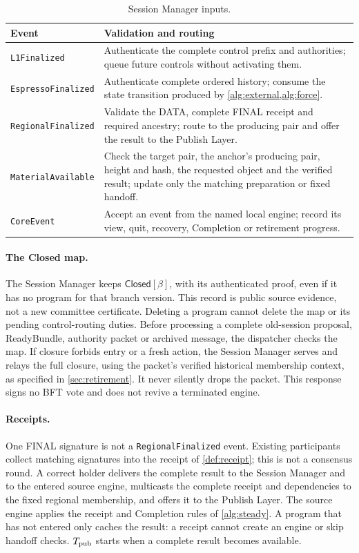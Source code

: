 \documentclass[11pt,a4paper]{article}
\newcommand{\tagg}[1]{\ensuremath{\mathsf{#1}}}
\begin{document}
\begin{table}[htbp]\centering\small
\caption{Session Manager inputs.}
\label{tab:manager-inputs}
\begin{tabularx}{\linewidth}{@{}>{\raggedright\arraybackslash}p{.24\linewidth}Y@{}}\toprule
Event & Validation and routing\\\midrule
\texttt{L1Finalized} & Authenticate the complete control prefix and
authorities; queue future controls without activating them.\\
\texttt{EspressoFinalized} & Authenticate complete ordered history;
consume the state transition produced by \cref{alg:external,alg:force}.\\
\texttt{RegionalFinalized} & Validate the DATA, complete FINAL receipt
and required ancestry; route to the producing pair and offer the result
to the Publish Layer.\\
\texttt{MaterialAvailable} & Check the target pair, the anchor's producing
pair, height and hash, the requested object and the verified result;
update only the matching preparation or fixed handoff.\\
\texttt{CoreEvent} & Accept an event from the named local engine;
record its view, quit, recovery, Completion or retirement progress.\\\bottomrule
\end{tabularx}
\end{table}

\paragraph{The Closed map.}
The Session Manager keeps $\tagg{Closed}[\beta]$, with its authenticated
proof, even if it has no program for that branch version. This record is
public source evidence, not a new committee certificate. Deleting a
program cannot delete the map or its pending control-routing duties.
Before processing a complete old-session proposal, ReadyBundle, authority
packet or archived message, the dispatcher checks the map. If closure
forbids entry or a fresh action, the Session Manager serves and relays
the full closure, using the packet's verified historical membership
context, as specified in \cref{sec:retirement}. It never silently drops
the packet. This response signs no BFT vote and does not revive a
terminated engine.

\paragraph{Receipts.}
One FINAL signature is not a \texttt{RegionalFinalized} event. Existing
participants collect matching signatures into the receipt of
\cref{def:receipt}; this is not a consensus round. A correct holder
delivers the complete result to the Session Manager and to the entered
source engine, multicasts the complete receipt and dependencies to the
fixed regional membership, and offers it to the Publish Layer. The source
engine applies the receipt and Completion rules of \cref{alg:steady}. A
program that has not entered only caches the result: a receipt cannot
create an engine or skip handoff checks. $T_{\rm pub}$ starts when a
complete result becomes available.
\end{document}
